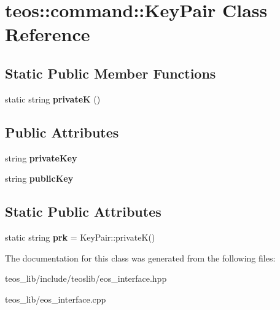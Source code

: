 \hypertarget{classteos_1_1command_1_1_key_pair}{}\section{teos\+:\+:command\+:\+:Key\+Pair Class Reference}
\label{classteos_1_1command_1_1_key_pair}
\subsection*{Static Public Member Functions}
\begin{DoxyCompactItemize}
\item 
\mbox{\label{classteos_1_1command_1_1_key_pair_a296e5566e03dd649860c3ef98e152682}} 
static string {\bfseries privateK} ()
\end{DoxyCompactItemize}
\subsection*{Public Attributes}
\begin{DoxyCompactItemize}
\item 
\mbox{\label{classteos_1_1command_1_1_key_pair_a6f255ea2d4ebc95b7af0da0ae9fb4618}} 
string {\bfseries private\+Key}
\item 
\mbox{\label{classteos_1_1command_1_1_key_pair_a642b4737875a24960d8acfd27f6bccc7}} 
string {\bfseries public\+Key}
\end{DoxyCompactItemize}
\subsection*{Static Public Attributes}
\begin{DoxyCompactItemize}
\item 
\mbox{\label{classteos_1_1command_1_1_key_pair_accd00dfb50854f396732befecdcf71d1}} 
static string {\bfseries prk} = Key\+Pair\+::privateK()
\end{DoxyCompactItemize}


The documentation for this class was generated from the following files\+:\begin{DoxyCompactItemize}
\item 
teos\+\_\+lib/include/teoslib/eos\+\_\+interface.\+hpp\item 
teos\+\_\+lib/eos\+\_\+interface.\+cpp\end{DoxyCompactItemize}
